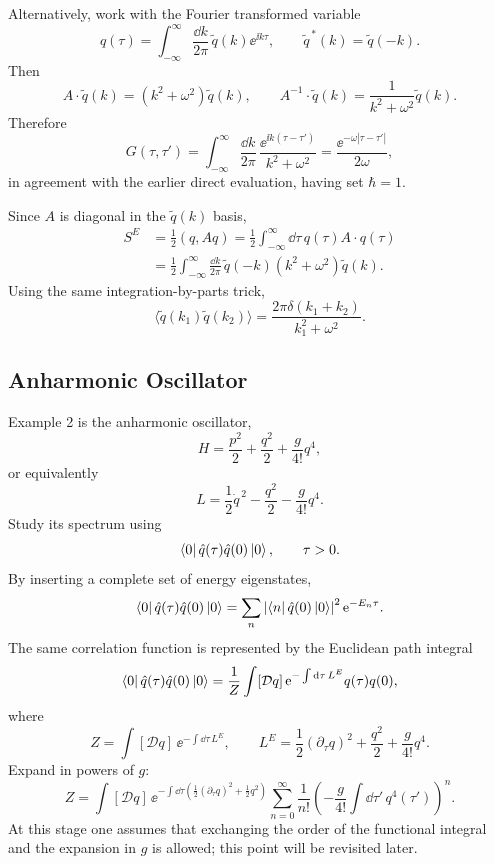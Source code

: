 Alternatively, work with the Fourier transformed variable
\[
  q(\tau)
  =
  \int_{-\infty}^{\infty}
  \frac{\dd k}{2\pi}\,\tilde q(k)\ee^{\ii k\tau},
  \qquad
  \tilde q^{\,*}(k)=\tilde q(-k).
\]
Then
\[
  A\cdot\tilde q(k)=(k^2+\omega^2)\tilde q(k),
  \qquad
  A^{-1}\cdot\tilde q(k)=\frac{1}{k^2+\omega^2}\tilde q(k).
\]
Therefore
\[
  G(\tau,\tau')
  =
  \int_{-\infty}^{\infty}
  \frac{\dd k}{2\pi}\,
  \frac{\ee^{\ii k(\tau-\tau')}}{k^2+\omega^2}
  =
  \frac{\ee^{-\omega|\tau-\tau'|}}{2\omega},
\]
in agreement with the earlier direct evaluation, having set $\hbar=1$.

Since $A$ is diagonal in the $\tilde q(k)$ basis,
\[
\begin{aligned}
  S^E
  &=
  \frac12(q,Aq)
  =
  \frac12\int_{-\infty}^{\infty}\dd\tau\,q(\tau)A\cdot q(\tau)
  \\
  &=
  \frac12
  \int_{-\infty}^{\infty}
  \frac{\dd k}{2\pi}\,
  \tilde q(-k)(k^2+\omega^2)\tilde q(k).
\end{aligned}
\]
Using the same integration-by-parts trick,
\[
  \langle \tilde q(k_1)\tilde q(k_2)\rangle
  =
  \frac{2\pi\delta(k_1+k_2)}{k_1^2+\omega^2}.
\]

\subsection{Anharmonic Oscillator}

Example 2 is the anharmonic oscillator,
\[
  H=\frac{p^2}{2}+\frac{q^2}{2}+\frac{g}{4!}q^4,
\]
or equivalently
\[
  L=\frac12\dot q^{\,2}-\frac{q^2}{2}-\frac{g}{4!}q^4.
\]
Study its spectrum using
\[
  \bra{0}\hat q(\tau)\hat q(0)\ket{0},
  \qquad
  \tau>0.
\]
By inserting a complete set of energy eigenstates,
\[
  \bra{0}\hat q(\tau)\hat q(0)\ket{0}
  =
  \sum_n
  \left|\bra{n}\hat q(0)\ket{0}\right|^2
  \mathrm{e}^{-E_n\tau}.
\]
The same correlation function is represented by the Euclidean path integral
\[
  \bra{0}\hat q(\tau)\hat q(0)\ket{0}
  =
  \frac{1}{Z}
  \int[\mathcal Dq]\,
  \mathrm{e}^{-\int\mathrm{d}\tau\,L^E}
  q(\tau)q(0),
\]
where
\[
  Z=\int[\mathcal Dq]\,\ee^{-\int\dd\tau\,L^E},
  \qquad
  L^E=\frac12(\partial_\tau q)^2+\frac{q^2}{2}+\frac{g}{4!}q^4.
\]
Expand in powers of $g$:
\[
  Z
  =
  \int[\mathcal Dq]\,
  \ee^{-\int\dd\tau\left(\frac12(\partial_\tau q)^2+\frac12q^2\right)}
  \sum_{n=0}^{\infty}
  \frac{1}{n!}
  \left(
    -\frac{g}{4!}\int\dd\tau'\,q^4(\tau')
  \right)^n.
\]
At this stage one assumes that exchanging the order of the functional integral
and the expansion in $g$ is allowed; this point will be revisited later.

